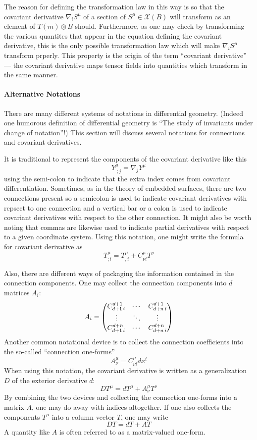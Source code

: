 \documentclass[12pt]{article}
\newcommand{\vs}{\mathcal{X}}
\begin{document}
The reason for defining the transformation law in this way is so that the covariant derivative $\nabla_i S^\mu$ of a section of $S^\mu \in \vs(B)$ will transform as an element of $T(m) \otimes B$ should.  Furthermore, as one may check by transforming the various quantites that appear in the equation defining the covariant derivative, this is the only possible transformation law which will make $\nabla_i S^\mu$ transform prperly.  This property is the origin of the term ``covariant derivative'' --- the covariant derivative maps tensor fields into quantities which transform in the same manner.

\paragraph {Alternative Notations}
There are many different systems of notations in differential geometry.  (Indeed one humorous definition of differential geometry is ``The study of invariants under change of notation''!)  This section will discuss several notations for connections and covariant derivatives.

It is traditional to represent the components of the covariant derivative like this 
$$Y^\mu_{\; ;j} = \nabla_j Y^\mu$$
using the semi-colon to indicate that the extra index
comes from covariant differentiation.  Sometimes, as in the theory of embedded surfaces, there are two connections present so a semicolon is used to indicate covariant derivatives with repsect to one connection and a vertical bar or a colon is used to indicate covariant derivatives with respect to the other connection.  It might also be worth noting that commas are likewise used to indicate partial derivatives with respect to a given coordinate system.  Using this notation, one might write the formula for covariant derivative as
 $$T^\mu_{;i} = T^\mu_{,i} + C^\mu_{\nu i} T^\nu$$

Also, there are different ways of packaging the information contained in the connection components.  One may collect the connection components into $d$ matrices $A_i$:
 $$A_i = \begin{pmatrix} C^{d+1}_{d+1 \, i} & \cdots & C^{d+1}_{d+n \, i} \cr \vdots & \ddots & \vdots \cr C^{d+n}_{d+1 \, i} & \cdots & C^{d+n}_{d+n \, i}\end{pmatrix}$$
Another common notational device is to collect the connection coefficients into the so-called ``connection one-forms''
 $$A^\mu_\nu = C^\mu_{\nu i} dx^i$$
When using this notation, the covariant derivative is written as a generalization $D$ of the exterior derivative $d$:
 $$D T^\mu = d T^\mu + A^\mu_\nu T^\nu$$
By combining the two devices and collecting the connection one-forms into a matrix $A$, one may do away with indices altogether.  If one also collects the components $T^\mu$ into a column vector $T$, one may write
 $$DT = dT + AT$$
A quantity like $A$ is often referred to as a matrix-valued one-form.
\end{document}
